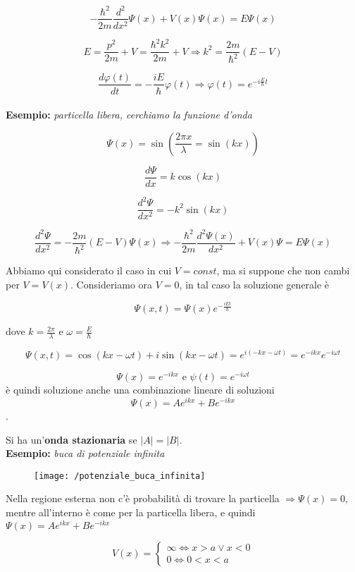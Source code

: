 $$ -\frac{\hbar^2}{2m} \frac{d^2}{dx^2} \Psi(x) + V(x)\Psi(x) = E\Psi(x) $$

$$E = \frac{p^2}{2m} + V = \frac{\hbar^2 k^2}{2m} + V \Rightarrow k^2 = \frac{2m}{\hbar^2}(E-V) $$

$$ \frac{d \varphi(t)}{dt} = - \frac{i E}{\hbar} \varphi(t) \Rightarrow \varphi(t) = e^{-i \frac{E}{\hbar} t} $$ \\


\textbf{Esempio:} \textit{particella libera, cerchiamo la funzione d'onda}

$$ \Psi(x) = \sin (\frac{2\pi x}{\lambda} = \sin(k x)) $$

$$ \frac{d\Psi}{dx} = k \cos(k x)$$

$$ \frac{d^2\Psi}{dx^2} = -k^2 \sin(k x)$$

$$ \frac{d^2\Psi}{dx^2} = - \frac{2m}{\hbar ^2} (E - V) \Psi(x) \Rightarrow - \frac{\hbar ^2}{2m} \frac{d^2 \Psi(x)}{dx ^2} + V(x)\Psi = E \Psi(x) $$

Abbiamo qui considerato il caso in cui $V = const$, ma si suppone che non cambi per $V=V(x)$.
Consideriamo ora $V=0$, in tal caso la soluzione generale è

$$ \Psi(x, t) = \Psi(x) e^{-\frac{i E t}{\hbar}} $$

dove $ k = \frac{2 \pi}{\lambda} $ e $ \omega = \frac{E}{\hbar} $

$$ \Psi(x, t) = \cos ( k x -\omega t ) + i \sin ( k x -\omega t ) = e^{ i (- k x - \omega t )} = e^{- i k x} e^{- i \omega t} $$

$$ \Psi (x) = e^{- i k x} \mbox{  e  }  \psi (t) = e^{- i \omega t} $$
è quindi soluzione anche una combinazione lineare di soluzioni 
$$\Psi (x) = A e^{i k x} + B e^{- i k x} $$.

Si ha un'\textbf{onda stazionaria} se $|A| = |B| $. \\

\textbf{Esempio:} \textit{buca di potenziale infinita}

\begin{figure}[h]
\centering
\texttt{[image: /potenziale\_buca\_infinita]}
\end{figure}

Nella regione esterna non c'è probabilità di trovare la particella $\Rightarrow \Psi (x) = 0$, mentre all'interno è come per la particella libera, 
e quindi $\Psi (x) = A e^{i k x} + B e^{- i k x} $

\begin{equation}
V(x) = 
\begin{cases}
	\infty \Longleftrightarrow x>a \vee x<0 \\
	0 \Longleftrightarrow 0 < x < a
\end{cases}
\end{equation}

